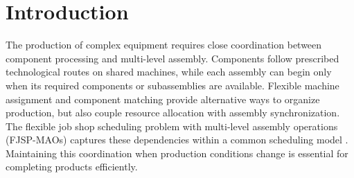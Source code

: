 \section{Introduction}
\label{sec:introduction}





The production of complex equipment requires close coordination between component processing
and multi-level assembly. Components follow prescribed technological routes on shared machines,
while each assembly can begin only when its required components or subassemblies are available.
Flexible machine assignment and component matching provide alternative ways to organize production,
but also couple resource allocation with assembly synchronization. The flexible job shop scheduling problem
with multi-level assembly operations (FJSP-MAOs) captures these dependencies within a common scheduling
model \cite{ning2027fjspmaos}. Maintaining this coordination when production conditions change is
essential for completing products efficiently.







